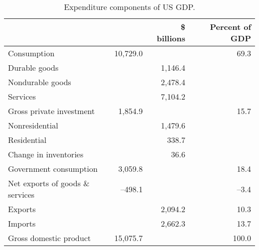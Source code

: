 \begin{table}[h!]
\centering
\caption{Expenditure components of US GDP.}
\label{tb:gdp_exp}
\begin{tabular*}{0.95\textwidth}{l@{\extracolsep{\fill}}rrr}
\toprule
                                        &        & \$ billions & Percent of GDP\\%
                      \midrule
Consumption                             & 10,729.0 &              & 69.3         \\%
\hspace{.5cm}Durable goods              &         & 1,146.4        &                \\%
\hspace{.5cm}Nondurable goods           &         & 2,478.4     &                \\%
\hspace{.5cm}Services                   &         & 7,104.2     &                \\%
Gross private  investment       & 1,854.9 &              & 15.7         \\%
\hspace{.5cm}Nonresidential             &         & 1,479.6      &                \\%
\hspace{.5cm}Residential                &         & 338.7        &                \\%
\hspace{.5cm}Change in inventories      &         & 36.6      &                \\%
Government consumption                  & 3,059.8 &              &18.4          \\%
Net exports of goods \& services       & --498.1 &              &--3.4          \\%
\hspace{.5cm}Exports                    &         & 2,094.2      &10.3          \\%
\hspace{.5cm}Imports                    &         & 2,662.3      &13.7          \\%
\midrule
Gross domestic product                   &15,075.7&              &100.0          \\%


\end{tabular*}
\end{table}
